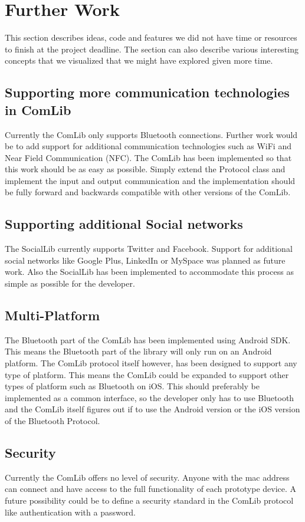 \section{Further Work}
This section describes ideas, code and features we did not have time or resources to
finish at the project deadline. The section can also describe various interesting concepts 
that we visualized that we might have explored given more time.

\subsection{Supporting more communication technologies in ComLib}
Currently the ComLib only supports Bluetooth connections. Further work would be
to add support for additional communication technologies such as WiFi and Near Field 
Communication (NFC). The ComLib has been implemented so that this work should
be as easy as possible. Simply extend the Protocol class and implement the input and
output communication and the implementation should be fully forward and backwards
compatible with other versions of the ComLib.

\subsection{Supporting additional Social networks}
The SocialLib currently supports Twitter and Facebook. Support for additional social
networks like Google Plus, LinkedIn or MySpace was planned as future work. Also the
SocialLib has been implemented to accommodate this process as simple as possible
for the developer.

\subsection{Multi-Platform}
The Bluetooth part of the ComLib has been implemented using Android SDK. This means 
the Bluetooth part of the library will only run on an Android platform. The ComLib protocol
itself however, has been designed to support any type of platform. This means the ComLib
could be expanded to support other types of platform such as Bluetooth on iOS. This
should preferably be implemented as a common interface, so the developer only has to use
Bluetooth and the ComLib itself figures out if to use the Android version or the iOS version of
the Bluetooth Protocol.

\subsection{Security}
Currently the ComLib offers no level of security. Anyone with the mac address can connect
and have access to the full functionality of each prototype device. A future possibility could
be to define a security standard in the ComLib protocol like authentication with a password.

